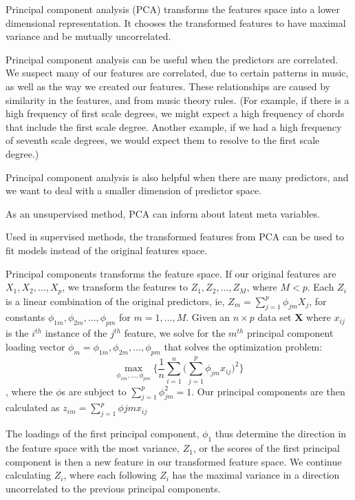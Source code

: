 \documentclass[12pt,twoside]{reedthesis}
\theoremstyle{definition}
\theoremstyle{definition}
\theoremstyle{definition}
\theoremstyle{remark}
\begin{document}
Principal component analysis (PCA) transforms the features space into a
lower dimensional representation. It chooses the transformed features to
have maximal variance and be mutually uncorrelated.

Principal component analysis can be useful when the predictors are
correlated. We suspect many of our features are correlated, due to
certain patterns in music, as well as the way we created our features.
These relationships are caused by similarity in the features, and from
music theory rules. (For example, if there is a high frequency of first
scale degrees, we might expect a high frequency of chords that include
the first scale degree. Another example, if we had a high frequency of
seventh scale degrees, we would expect them to resolve to the first
scale degree.)

Principal component analysis is also helpful when there are many
predictors, and we want to deal with a smaller dimension of predictor
space.

As an unsupervised method, PCA can inform about latent meta variables.

Used in supervised methods, the transformed features from PCA can be
used to fit models instead of the original features space.

Principal components transforms the feature space. If our original
features are \(X_1,X_2,\ldots,X_p\), we transform the features to
\(Z_1,Z_2,\ldots,Z_M\), where \(M < p\). Each \(Z_i\) is a linear
combination of the original predictors, ie,
\(Z_m = \sum_{j = 1}^p \phi_{jm}X_j\), for constants
\(\phi_{1m},\phi_{2m},\ldots,\phi_{pm}\) for \(m = 1,\ldots,M\). Given
an \(n\times p\) data set \(\mathbf{X}\) where \(x_{ij}\) is the
\(i^{th}\) instance of the \(j^{th}\) feature, we solve for the
\(m^{th}\) principal component loading vector
\(\phi_m = \phi_{1m},\phi_{2m},\ldots,\phi_{pm}\) that solves the
optimization problem:
\[\max_{\phi_{1m},\ldots,\phi_{pm}} \bigg\{\frac{1}{n}\sum_{i=1}^n\bigg(\sum_{j=1}^p \phi_{jm}x_{ij}\bigg)^2\bigg\}\],
where the \(\phi\)s are subject to \(\sum_{j = 1}^p\phi_{jm}^2 = 1\).
Our principal components are then calculated as
\(z_{im} = \sum_{j = 1}^p\phi{jm}x_{ij}\)

The loadings of the first principal component, \(\phi_1\) thus determine
the direction in the feature space with the most variance, \(Z_1\), or
the scores of the first principal component is then a new feature in our
transformed feature space. We continue calculating \(Z_i\), where each
following \(Z_i\) has the maximal variance in a direction uncorrelated
to the previous principal components.
\end{document}
